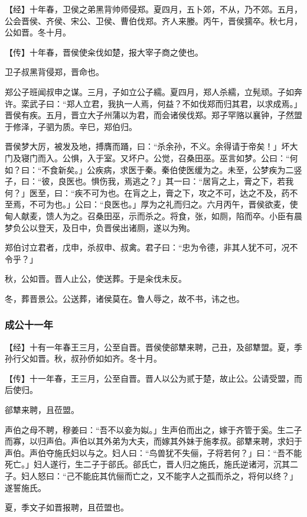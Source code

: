 \documentclass[]{article}
\begin{document}
【经】十年春，卫侯之弟黑背帅师侵郑。夏四月，五卜郊，不从，乃不郊。五月，公会晋侯、齐侯、宋公、卫侯、曹伯伐郑。齐人来媵。丙午，晋侯獳卒。秋七月，公如晋。冬十月。

【传】十年春，晋侯使籴伐如楚，报大宰子商之使也。

卫子叔黑背侵郑，晋命也。

郑公子班闻叔申之谋。三月，子如立公子繻。夏四月，郑人杀繻，立髡顽。子如奔许。栾武子曰：``郑人立君，我执一人焉，何益？不如伐郑而归其君，以求成焉。」晋侯有疾。五月，晋立大子州蒲以为君，而会诸侯伐郑。郑子罕赂以襄钟，子然盟于修泽，子驷为质。辛巳，郑伯归。

晋侯梦大厉，被发及地，搏膺而踊，曰：``杀余孙，不义。余得请于帝矣！」坏大门及寝门而入。公惧，入于室。又坏户。公觉，召桑田巫。巫言如梦。公曰：``何如？曰：``不食新矣。」公疾病，求医于秦。秦伯使医缓为之。未至，公梦疾为二竖子，曰：``彼，良医也。惧伤我，焉逃之？」其一曰：``居肓之上，膏之下，若我何？」医至，曰：``疾不可为也。在肓之上，膏之下，攻之不可，达之不及，药不至焉，不可为也。」公曰：``良医也。」厚为之礼而归之。六月丙午，晋侯欲麦，使甸人献麦，馈人为之。召桑田巫，示而杀之。将食，张，如厕，陷而卒。小臣有晨梦负公以登天，及日中，负晋侯出诸厕，遂以为殉。

郑伯讨立君者，戊申，杀叔申、叔禽。君子曰：``忠为令德，非其人犹不可，况不令乎？」

秋，公如晋。晋人止公，使送葬。于是籴伐未反。

冬，葬晋景公。公送葬，诸侯莫在。鲁人辱之，故不书，讳之也。

\hypertarget{header-n1670}{%
\subsubsection{成公十一年}\label{header-n1670}}

【经】十有一年春王三月，公至自晋。晋侯使郤犨来聘，己丑，及郤犨盟。夏，季孙行父如晋。秋，叔孙侨如如齐。冬十月。

【传】十一年春，王三月，公至自晋。晋人以公为贰于楚，故止公。公请受盟，而后使归。

郤犨来聘，且莅盟。

声伯之母不聘，穆姜曰：``吾不以妾为姒。」生声伯而出之，嫁于齐管于奚。生二子而寡，以归声伯。声伯以其外弟为大夫，而嫁其外妹于施孝叔。郤犨来聘，求妇于声伯。声伯夺施氏妇以与之。妇人曰：``鸟兽犹不失俪，子将若何？」曰：``吾不能死亡。」妇人遂行，生二子于郤氏。郤氏亡，晋人归之施氏，施氏逆诸河，沉其二子。妇人怒曰：``己不能庇其伉俪而亡之，又不能字人之孤而杀之，将何以终？」遂誓施氏。

夏，季文子如晋报聘，且莅盟也。
\end{document}
